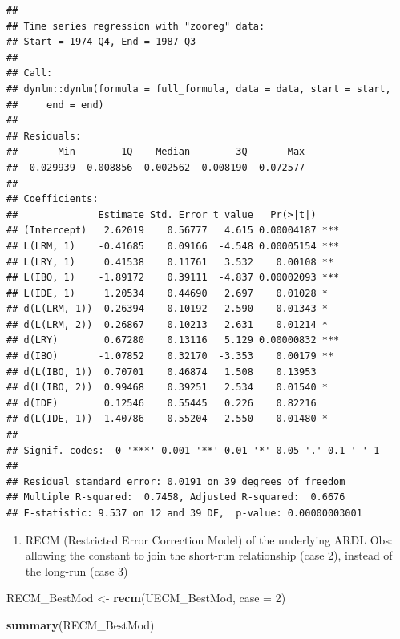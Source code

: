 \documentclass[
]{book}
\newenvironment{Shaded}{\begin{snugshade}}{\end{snugshade}}
\newcommand{\AttributeTok}[1]{\textcolor[rgb]{0.13,0.29,0.53}{#1}}
\newcommand{\DecValTok}[1]{\textcolor[rgb]{0.00,0.00,0.81}{#1}}
\newcommand{\FunctionTok}[1]{\textcolor[rgb]{0.13,0.29,0.53}{\textbf{#1}}}
\newcommand{\NormalTok}[1]{#1}
\newcommand{\OtherTok}[1]{\textcolor[rgb]{0.56,0.35,0.01}{#1}}
\providecommand{\tightlist}{%
  \setlength{\itemsep}{0pt}\setlength{\parskip}{0pt}}
\begin{document}
\begin{verbatim}
## 
## Time series regression with "zooreg" data:
## Start = 1974 Q4, End = 1987 Q3
## 
## Call:
## dynlm::dynlm(formula = full_formula, data = data, start = start, 
##     end = end)
## 
## Residuals:
##       Min        1Q    Median        3Q       Max 
## -0.029939 -0.008856 -0.002562  0.008190  0.072577 
## 
## Coefficients:
##              Estimate Std. Error t value   Pr(>|t|)    
## (Intercept)   2.62019    0.56777   4.615 0.00004187 ***
## L(LRM, 1)    -0.41685    0.09166  -4.548 0.00005154 ***
## L(LRY, 1)     0.41538    0.11761   3.532    0.00108 ** 
## L(IBO, 1)    -1.89172    0.39111  -4.837 0.00002093 ***
## L(IDE, 1)     1.20534    0.44690   2.697    0.01028 *  
## d(L(LRM, 1)) -0.26394    0.10192  -2.590    0.01343 *  
## d(L(LRM, 2))  0.26867    0.10213   2.631    0.01214 *  
## d(LRY)        0.67280    0.13116   5.129 0.00000832 ***
## d(IBO)       -1.07852    0.32170  -3.353    0.00179 ** 
## d(L(IBO, 1))  0.70701    0.46874   1.508    0.13953    
## d(L(IBO, 2))  0.99468    0.39251   2.534    0.01540 *  
## d(IDE)        0.12546    0.55445   0.226    0.82216    
## d(L(IDE, 1)) -1.40786    0.55204  -2.550    0.01480 *  
## ---
## Signif. codes:  0 '***' 0.001 '**' 0.01 '*' 0.05 '.' 0.1 ' ' 1
## 
## Residual standard error: 0.0191 on 39 degrees of freedom
## Multiple R-squared:  0.7458, Adjusted R-squared:  0.6676 
## F-statistic: 9.537 on 12 and 39 DF,  p-value: 0.00000003001
\end{verbatim}

\begin{enumerate}
\def\labelenumi{\arabic{enumi}.}
\setcounter{enumi}{2}
\tightlist
\item
  RECM (Restricted Error Correction Model) of the underlying ARDL Obs:
  allowing the constant to join the short-run relationship (case 2),
  instead of the long-run (case 3)
\end{enumerate}

\begin{Shaded}
\begin{Highlighting}[]
\NormalTok{RECM\_BestMod }\OtherTok{\textless{}{-}} \FunctionTok{recm}\NormalTok{(UECM\_BestMod, }\AttributeTok{case =} \DecValTok{2}\NormalTok{)}

\FunctionTok{summary}\NormalTok{(RECM\_BestMod)}
\end{Highlighting}
\end{Shaded}
\end{document}
